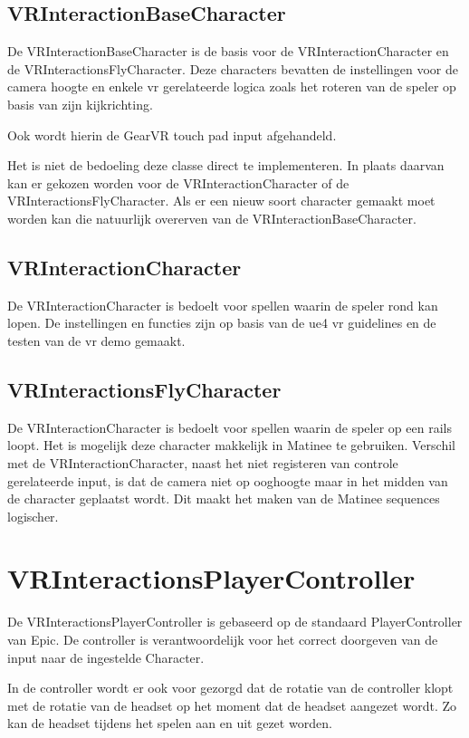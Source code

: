 \subsection{VRInteractionBaseCharacter}
De VRInteractionBaseCharacter is de basis voor de VRInteractionCharacter en de VRInteractionsFlyCharacter. Deze characters bevatten de instellingen voor de camera hoogte en enkele \gls{vr} gerelateerde logica zoals het roteren van de speler op basis van zijn kijkrichting.

Ook wordt hierin de GearVR touch pad input afgehandeld.

Het is niet de bedoeling deze classe direct te implementeren. In plaats daarvan kan er gekozen worden voor de VRInteractionCharacter of de VRInteractionsFlyCharacter. Als er een nieuw soort character gemaakt moet worden kan die natuurlijk overerven van de VRInteractionBaseCharacter.

\subsection{VRInteractionCharacter}
De VRInteractionCharacter is bedoelt voor spellen waarin de speler rond kan lopen. De instellingen en functies zijn op basis van de \gls{ue4} \gls{vr} guidelines en de testen van de \gls{vr} demo gemaakt.

\subsection{VRInteractionsFlyCharacter}
De VRInteractionCharacter is bedoelt voor spellen waarin de speler op een rails loopt. Het is mogelijk deze character makkelijk in Matinee te gebruiken. Verschil met de VRInteractionCharacter, naast het niet registeren van controle gerelateerde input, is dat de camera niet op ooghoogte maar in het midden van de character geplaatst wordt. Dit maakt het maken van de Matinee sequences logischer.

\section{VRInteractionsPlayerController}
De VRInteractionsPlayerController is gebaseerd op de standaard PlayerController van Epic. De controller is verantwoordelijk voor het correct doorgeven van de input naar de ingestelde Character.

In de controller wordt er ook voor gezorgd dat de rotatie van de controller klopt met de rotatie van de headset op het moment dat de headset aangezet wordt. Zo kan de headset tijdens het spelen aan en uit gezet worden.

